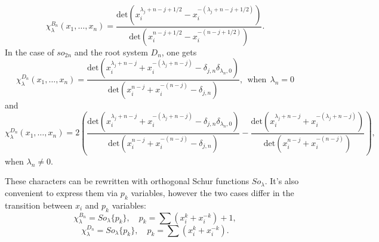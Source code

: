 \documentclass{article}
\begin{document}
\begin{equation}
    \chi_{\lambda}^{B_n} (x_1, \dots,x_n) = \frac{\text{det}\left(x_i^{\lambda_j+n-j+1/2}-x_i^{-(\lambda_j+n-j+1/2)}\right)}{\text{det}\left(x_i^{n-j+1/2}-x_i^{-(n-j+1/2)}\right)}.
    \label{chB}
\end{equation}
In the case of $so_{2n}$ and the root system $D_n$, one gets
\begin{equation}
    \chi_{\lambda}^{D_n} (x_1, \dots,x_n) = \frac{\text{det}\left(x_i^{\lambda_j+n-j}+x_i^{-(\lambda_j+n-j)}-\delta_{j,n}\delta_{\lambda_n,0}\right)}{\text{det}\left(x_i^{n-j}+x_i^{-(n-j)}-\delta_{j,n}\right)},\ \ \text{when}\ \  \lambda_n = 0
    \label{chD0}
\end{equation}
and
\begin{equation}
    \chi_{\lambda}^{D_n} (x_1, \dots,x_n) =2\left( \frac{\text{det}\left(x_i^{\lambda_j+n-j}+x_i^{-(\lambda_j+n-j)}-\delta_{j,n}\delta_{\lambda_n,0}\right)}{\text{det}\left(x_i^{n-j}+x_i^{-(n-j)}-\delta_{j,n}\right)}-\frac{\text{det}\left(x_i^{\lambda_j+n-j}+x_i^{-(\lambda_j+n-j)}\right)}{\text{det}\left(x_i^{n-j}+x_i^{-(n-j)}\right)} \right),
    \label{chD1}
\end{equation}
when $\lambda_n \neq 0$.

These characters can be rewritten with orthogonal Schur functions $So_{\lambda}$. It's also convenient to express them via $p_k$ variables, however the two cases differ in the transition between $x_i$ and $p_k$ variables:
\begin{equation}
    \chi_{\lambda} ^{B_n} = So_{\lambda}\{p_k\},\quad p_k = \sum (x_i^k+x_i^{-k}) + 1,
\end{equation}
 \begin{equation}
    \chi_{\lambda} ^{D_n} = So_{\lambda}\{p_k\},\quad p_k = \sum (x_i^k+x_i^{-k}).
\end{equation}
\end{document}

